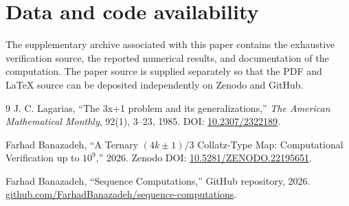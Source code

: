 \documentclass[11pt]{article}
\begin{document}
\section*{Data and code availability}
The supplementary archive associated with this paper contains the exhaustive verification source, the reported numerical results, and documentation of the computation. The paper source is supplied separately so that the PDF and LaTeX source can be deposited independently on Zenodo and GitHub.

\begin{thebibliography}{9}
J. C. Lagarias, ``The 3x+1 problem and its generalizations,'' \emph{The American Mathematical Monthly}, 92(1), 3--23, 1985. DOI: \href{https://doi.org/10.2307/2322189}{10.2307/2322189}.

Farhad Banazadeh, ``A Ternary $(4k\pm1)/3$ Collatz-Type Map: Computational Verification up to $10^9$,'' 2026. Zenodo DOI: \href{https://doi.org/10.5281/ZENODO.22195651}{10.5281/ZENODO.22195651}.

Farhad Banazadeh, ``Sequence Computations,'' GitHub repository, 2026. \href{https://github.com/FarhadBanazadeh/sequence-computations}{github.com/FarhadBanazadeh/sequence-computations}.
\end{thebibliography}
\end{document}
